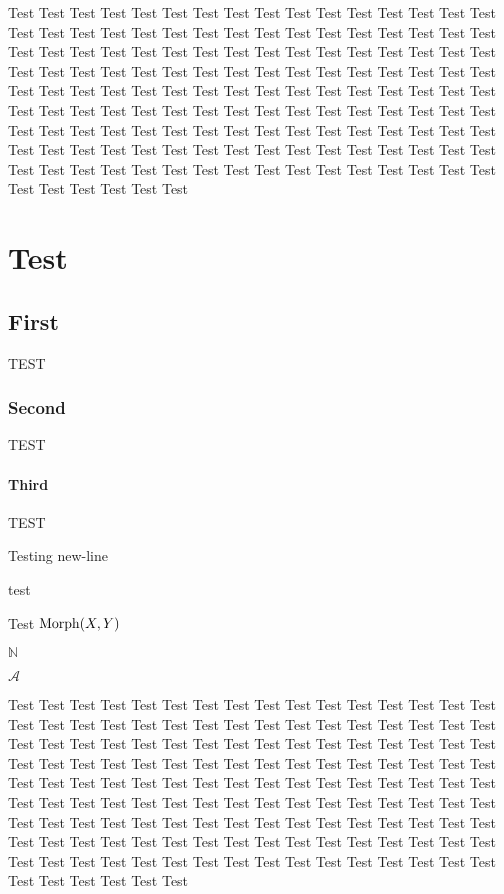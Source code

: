 \documentclass{amsbook}
\begin{document}
Test Test Test Test Test Test Test Test Test Test Test Test Test Test Test Test Test Test Test Test Test Test Test Test Test
Test Test Test Test Test Test Test Test Test Test Test Test Test Test Test Test Test Test Test Test Test Test Test Test Test
Test Test Test Test Test Test Test Test Test Test Test Test Test Test Test Test Test Test Test Test Test Test Test Test Test
Test Test Test Test Test Test Test Test Test Test Test Test Test Test Test Test Test Test Test Test Test Test Test Test Test
Test Test Test Test Test Test Test Test Test Test Test Test Test Test Test Test Test Test Test Test Test Test Test Test Test
Test Test Test Test Test Test Test Test Test Test Test Test Test Test Test Test Test Test Test Test Test Test Test Test Test

\chapter{Test}
\section{First}
TEST
\subsection{Second}
TEST
\subsubsection{Third}
TEST


\begin{thm}[Test]
Testing new-line

\begin{lem}[Test1]
test
\end{lem}

\end{thm}

\noindent Test $ \operatorname{Morph}(X,Y) $

$ \mathbb{N} $

$ \mathscr{A} $


\begin{exr}

    Test Test Test Test Test Test Test Test Test Test Test Test Test Test Test Test Test Test Test Test Test Test Test Test Test
    Test Test Test Test Test Test Test Test Test Test Test Test Test Test Test Test Test Test Test Test Test Test Test Test Test
    Test Test Test Test Test Test Test Test Test Test Test Test Test Test Test Test Test Test Test Test Test Test Test Test Test
    Test Test Test Test Test Test Test Test Test Test Test Test Test Test Test Test Test Test Test Test Test Test Test Test Test
    Test Test Test Test Test Test Test Test Test Test Test Test Test Test Test Test Test Test Test Test Test Test Test Test Test
    Test Test Test Test Test Test Test Test Test Test Test Test Test Test Test Test Test Test Test Test Test Test Test Test Test


\end{exr}
\end{document}
